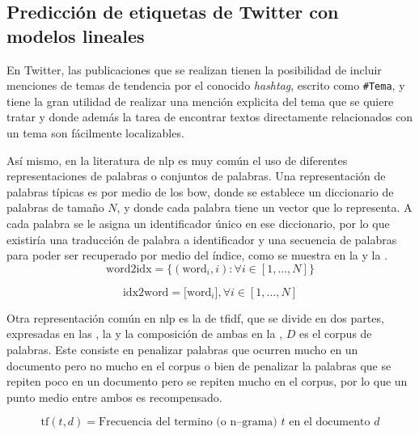 \subsection{Predicción de etiquetas de Twitter con modelos lineales} \label{sec:twitter-prediction}
En Twitter, las publicaciones que se realizan tienen la posibilidad de incluir menciones de temas de tendencia por el conocido \emph{hashtag}, escrito como \texttt{\#Tema}, y tiene la gran utilidad de realizar una mención explicita del tema que se quiere tratar y donde además la tarea de encontrar textos directamente relacionados con un tema son fácilmente localizables.

Así mismo, en la literatura de \gls{nlp} es muy común el uso de diferentes representaciones de palabras o conjuntos de palabras. Una representación de palabras típicas es por medio de los \gls{bow}, donde se establece un diccionario de palabras de tamaño $N$, y donde cada palabra tiene un vector que lo representa. A cada palabra se le asigna un identificador único en ese diccionario, por lo que existiría una traducción de palabra a identificador y una secuencia de palabras para poder ser recuperado por medio del índice, como se muestra en la  y la .
\begin{equation} \label{eq:bow-repr1}
  \text{word2idx} = \Big\{(\text{word}_i, i) : \forall i \in [1, \ldots, N] \Big\}
\end{equation}

\begin{equation} \label{eq:bow-repr2}
  \text{idx2word} = \Big[\text{word}_i\Big], \forall i \in [1, \ldots, N]
\end{equation}

Otra representación común en \gls{nlp} es la de \gls{tfidf}, que se divide en dos partes, expresadas en las , la  y la composición de ambas en la , $D$ es el corpus de palabras. Este consiste en penalizar palabras que ocurren mucho en un documento pero no mucho en el corpus o bien de penalizar la palabras que se repiten poco en un documento pero se repiten mucho en el corpus, por lo que un punto medio entre ambos es recompensado.

\begin{equation} \label{eq:tf-repr}
  \text{tf}(t,d) = \text{Frecuencia del termino (o n--grama) } t \text{ en el documento } d
\end{equation}

